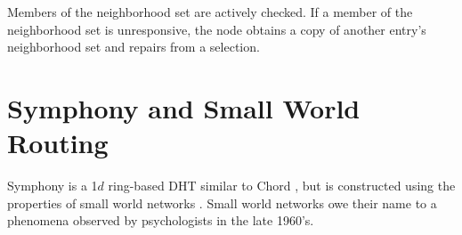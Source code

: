 Members of the neighborhood set are actively checked.
If a member of the neighborhood set is unresponsive, the node obtains a copy of another entry's neighborhood set and repairs from a selection.















\section{Symphony and Small World Routing}
Symphony  \cite{symphony} is a 1$d$ ring-based DHT similar to Chord \cite{chord}, but is constructed using the properties of small world networks \cite{kleinberg2000small}.
Small world networks owe their name to a phenomena observed by psychologists in the late 1960's. 

